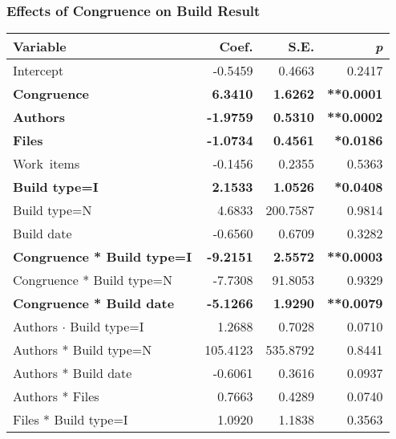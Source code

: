 \subsubsection{Effects of Congruence on Build Result}
\label{sec:congruence_effect_build_result}

\begin{table}[t]
\begin{center}
\small
\begin{tabular}{l@{\hspace{0pt}}r@{\hspace{10pt}}r@{\hspace{5pt}}r}
\toprule
Variable & Coef. & S.E. & \emph{p} \\
	\midrule
Intercept                   &  -0.5459 &   0.4663 & 0.2417 \\
\textbf{Congruence}              &   \textbf{6.3410} &   \textbf{1.6262} & \textbf{**0.0001} \\
\textbf{Authors}                     &  \textbf{-1.9759} &   \textbf{0.5310} & \textbf{**0.0002}  \\
\textbf{Files}                       &  \textbf{-1.0734} &   \textbf{0.4561} & \textbf{*0.0186}  \\
Work~items                   &  -0.1456 &   0.2355 & 0.5363  \\
\textbf{Build type=I}                      &   \textbf{2.1533} &   \textbf{1.0526} & \textbf{*0.0408}  \\
Build type=N                      &   4.6833 & 200.7587 & 0.9814  \\
Build date                   &  -0.6560 &   0.6709 & 0.3282  \\
\textbf{Congruence * Build type=I}     &  \textbf{-9.2151} &   \textbf{2.5572} & \textbf{**0.0003}  \\
Congruence * Build type=N     &  -7.7308 &  91.8053 & 0.9329  \\
\textbf{Congruence * Build date}  &  \textbf{-5.1266} &   \textbf{1.9290} & \textbf{**0.0079}  \\
Authors $\cdot$ Build type=I            &   1.2688 &   0.7028 & 0.0710  \\
Authors * Build type=N            & 105.4123 & 535.8792 & 0.8441  \\
Authors * Build date         &  -0.6061 &   0.3616 & 0.0937 \\
Authors * Files             &   0.7663 &   0.4289 & 0.0740  \\
Files * Build type=I              &   1.0920 &   1.1838 & 0.3563  \\

\end{tabular}
\end{center}
\end{table}
